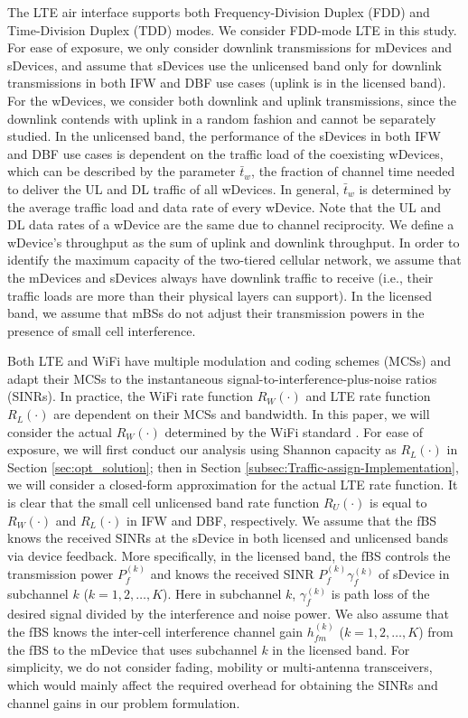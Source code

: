 \documentclass[journal,final,letterpaper,10pt,doublecolumn,twoside]{IEEEtran}
\begin{document}
The LTE air interface \cite{LTE-A} supports both Frequency-Division Duplex (FDD) and Time-Division Duplex (TDD) modes.
We consider FDD-mode LTE in this study. For ease of exposure, we only consider downlink transmissions for mDevices and sDevices, and assume that sDevices use the unlicensed band only for downlink transmissions in both IFW and DBF use cases (uplink is in the licensed band). For the wDevices, we consider both downlink and uplink transmissions, since the downlink contends with uplink in a random fashion and cannot be separately studied.
In the unlicensed band, the performance of the sDevices in both IFW and DBF use cases is dependent on the traffic load of the coexisting wDevices,
which can be described by the parameter $\bar{t}_w$, the fraction of
channel time needed to deliver the UL and DL traffic of all wDevices.
In general, $\bar{t}_w$ is determined by the  average traffic load
and data rate of every wDevice. Note that the UL and DL data rates of a wDevice are the same due to channel reciprocity.	 We define a wDevice’s throughput as the sum of uplink and downlink throughput. In order to identify the maximum capacity of the two-tiered cellular
network, we assume that the mDevices and sDevices always have downlink traffic to receive (i.e., their traffic loads are more than their physical layers can support).   In the licensed band, we assume that mBSs do not adjust their transmission powers
in the presence of small cell interference.

Both LTE and WiFi have multiple modulation and coding schemes (MCSs)
and adapt their MCSs to the instantaneous
signal-to-interference-plus-noise ratios (SINRs). In practice, the
WiFi rate function $R_W(\cdot)$ and LTE rate function $R_L(\cdot)$
are dependent on their MCSs and bandwidth. In this paper, we will
consider the actual $R_W(\cdot)$ determined by the WiFi standard
\cite{802.11-2007}. For ease of exposure, we will first conduct our
analysis using Shannon capacity as $R_L(\cdot)$ in Section
\ref{sec:opt_solution}; then in Section
\ref{subsec:Traffic-assign-Implementation}, we will consider a
closed-form approximation for the actual LTE rate function.   It is
clear that the small cell unlicensed band rate function $R_U(\cdot)$
is equal to $R_W(\cdot)$ and $R_L(\cdot)$ in IFW and DBF,
respectively. We assume that the fBS knows the received SINRs at the
sDevice in both licensed and unlicensed bands via device feedback.
More specifically, in the licensed band, the fBS controls the transmission power $P_f^{(k)}$ and knows the received SINR $P_f^{(k)} \gamma_f^{(k)}$ of sDevice in subchannel $k$ ($k=1,2,\dots,K$). Here in subchannel $k$, $\gamma_f^{(k)}$  is  path loss of the desired signal divided by the interference and noise power.
We also assume that the fBS knows the inter-cell
interference channel gain $h_{fm}^{(k)}$ ($k=1,2,\dots,K$) from the
fBS to the mDevice that uses subchannel $k$ in the licensed band. For
simplicity, we do not consider fading, mobility or multi-antenna
transceivers, which would mainly affect the required overhead for
obtaining the SINRs and channel gains in our problem formulation.
\end{document}
